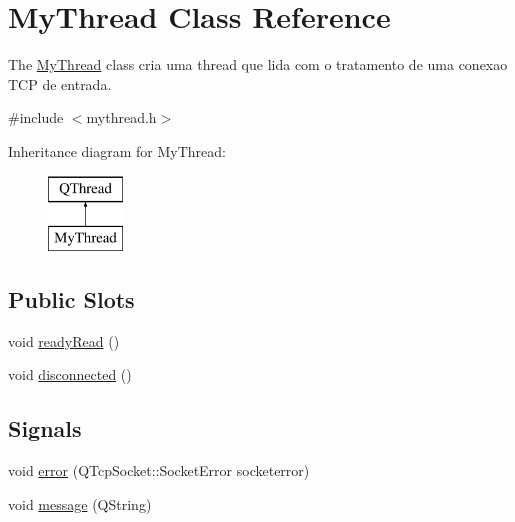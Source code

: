 \hypertarget{class_my_thread}{}\section{My\+Thread Class Reference}
\label{class_my_thread}


The \mbox{\hyperlink{class_my_thread}{My\+Thread}} class cria uma thread que lida com o tratamento de uma conexao T\+CP de entrada.  




{\ttfamily \#include $<$mythread.\+h$>$}

Inheritance diagram for My\+Thread\+:\begin{figure}[H]
\begin{center}
\leavevmode
\includegraphics[height=2.000000cm]{class_my_thread}
\end{center}
\end{figure}
\subsection*{Public Slots}
\begin{DoxyCompactItemize}
\item 
void \mbox{\hyperlink{class_my_thread_a277618fdd448b927f2e250c2076fc176}{ready\+Read}} ()
\item 
void \mbox{\hyperlink{class_my_thread_a447710039787ae20134a9b572487840f}{disconnected}} ()
\end{DoxyCompactItemize}
\subsection*{Signals}
\begin{DoxyCompactItemize}
\item 
void \mbox{\hyperlink{class_my_thread_aebf11d93838f22c9547d0c6aa97002be}{error}} (Q\+Tcp\+Socket\+::\+Socket\+Error socketerror)
\item 
void \mbox{\hyperlink{class_my_thread_ae49528d4ec1b2208240f707f5aa74adf}{message}} (Q\+String)
\end{DoxyCompactItemize}
